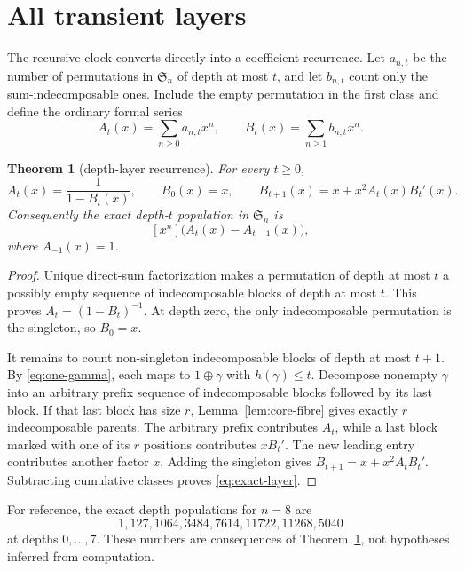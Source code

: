 \documentclass[a4paper,10pt]{amsart}
\newtheorem{theorem}{Theorem}[section]
\theoremstyle{definition}
\theoremstyle{remark}
\begin{document}
\section{All transient layers}

The recursive clock converts directly into a coefficient recurrence.  Let
$a_{n,t}$ be the number of permutations in $\mathfrak S_n$ of depth at most
$t$, and let $b_{n,t}$ count only the sum-indecomposable ones.  Include the
empty permutation in the first class and define the ordinary formal series
\[
 A_t(x)=\sum_{n\ge0}a_{n,t}x^n,
 \qquad
 B_t(x)=\sum_{n\ge1}b_{n,t}x^n.
\]

\begin{theorem}[depth-layer recurrence]\label{thm:layers}
For every $t\ge0$,
\begin{equation}\label{eq:AB-recurrence}
 A_t(x)=\frac{1}{1-B_t(x)},\qquad B_0(x)=x,
 \qquad B_{t+1}(x)=x+x^2A_t(x)B_t'(x).
\end{equation}
Consequently the exact depth-$t$ population in $\mathfrak S_n$ is
\begin{equation}\label{eq:exact-layer}
                    [x^n]\bigl(A_t(x)-A_{t-1}(x)\bigr),
\end{equation}
where $A_{-1}(x)=1$.
\end{theorem}

\begin{proof}
Unique direct-sum factorization makes a permutation of depth at most $t$ a
possibly empty sequence of indecomposable blocks of depth at most $t$.
This proves $A_t=(1-B_t)^{-1}$.  At depth zero, the only indecomposable
permutation is the singleton, so $B_0=x$.

It remains to count non-singleton indecomposable blocks of depth at most
$t+1$.  By \eqref{eq:one-gamma}, each maps to $1\oplus\gamma$ with
$h(\gamma)\le t$.  Decompose nonempty $\gamma$ into an arbitrary prefix
sequence of indecomposable blocks followed by its last block.  If that last
block has size $r$, Lemma~\ref{lem:core-fibre} gives exactly $r$
indecomposable parents.  The arbitrary prefix contributes $A_t$, while a
last block marked with one of its $r$ positions contributes $xB_t'$.  The
new leading entry contributes another factor $x$.  Adding the singleton
gives $B_{t+1}=x+x^2A_tB_t'$.  Subtracting cumulative classes proves
\eqref{eq:exact-layer}.
\end{proof}

For reference, the exact depth populations for $n=8$ are
\[
 1,127,1064,3484,7614,11722,11268,5040
\]
at depths $0,\ldots,7$.  These numbers are consequences of
Theorem~\ref{thm:layers}, not hypotheses inferred from computation.
\end{document}
